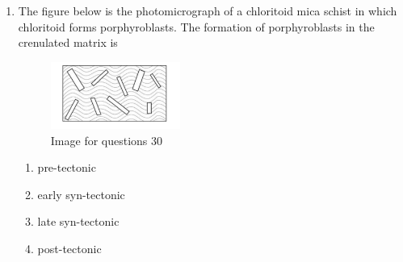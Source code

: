 \documentclass[journal,12pt,onecolumn]{IEEEtran}
\theoremstyle{remark}
\begin{document}
\begin{enumerate}
\item The figure below is the photomicrograph of a chloritoid mica schist in which chloritoid forms porphyroblasts. The formation of porphyroblasts in the crenulated matrix is 


\begin{figure}[H]
    \centering
    \includegraphics[width=0.4\textwidth]{figs/fig3.png}
    \caption{Image for questions 30}
    \label{fig:question30B}
\end{figure}







\begin{multicols}{2}
\begin{enumerate}
\item pre-tectonic  
\item early syn-tectonic  
\item late syn-tectonic  
\item post-tectonic  
\end{enumerate}
\end{multicols}
\end{enumerate}
\end{document}
